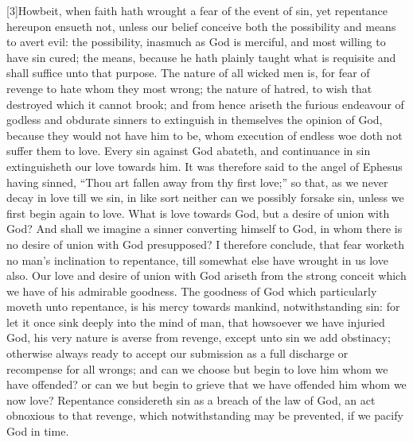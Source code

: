 [3]Howbeit, when faith hath wrought a fear of the event of sin, yet repentance hereupon ensueth not, unless our belief conceive both the possibility and means to avert evil: the possibility, inasmuch as God is merciful, and most willing to have sin cured; the means, because he hath plainly taught what is requisite and shall suffice unto that purpose. The nature of all wicked men is, for fear of revenge to hate whom they most wrong; the nature of hatred, to wish that destroyed which it cannot brook; and from hence ariseth the furious endeavour of godless and obdurate sinners to extinguish in themselves the opinion of God, because they would not have him to be, whom execution of endless woe doth not suffer them to love. Every sin against God abateth, and continuance in sin extinguisheth our love towards him. It was therefore said to the angel of Ephesus having sinned, “Thou art fallen away from thy first love;” so that, as we never decay in love till we sin, in like sort neither can we possibly forsake sin, unless we first begin again to love. What is love towards God, but a desire of union with God? And shall we imagine a sinner converting himself to God, in whom there is no desire of union with God presupposed? I therefore conclude, that fear worketh no man’s inclination to repentance, till somewhat else have wrought in us love also. Our love and desire of union with God ariseth from the strong conceit which we have of his admirable goodness. The goodness of God which particularly moveth unto repentance, is his mercy towards mankind, notwithstanding sin: for let it once sink deeply into the mind of man, that howsoever we have injuried God, his very nature is averse from revenge, except unto sin we add obstinacy; otherwise always ready to accept our submission as a full discharge or recompense for all wrongs; and can we choose but begin to love him whom we have offended? or can we but begin to grieve that we have offended him whom we now love? Repentance considereth sin as a breach of the law of God, an act obnoxious to that revenge, which notwithstanding may be prevented, if we pacify God in time.

